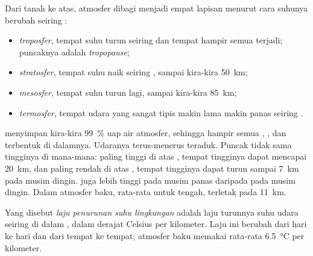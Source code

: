 \begin{definition}\label{def:g8:the-atmosphere:layers}
Dari tanah ke atas, atmosfer dibagi menjadi empat lapisan menurut cara
suhunya berubah seiring :
\begin{itemize}
  \item \emph{troposfer}, tempat suhu turun seiring
         dan tempat hampir semua  terjadi; puncaknya adalah
        \emph{tropopause};
  \item \emph{stratosfer}, tempat suhu naik seiring
        , sampai kira-kira \qty{50}{km};
  \item \emph{mesosfer}, tempat suhu turun lagi, sampai
        kira-kira \qty{85}{km};
  \item \emph{termosfer}, tempat udara yang sangat tipis
        makin lama makin panas seiring .
\end{itemize}
\end{definition}

 menyimpan kira-kira 99~\% uap air atmosfer, sehingga hampir semua
, , dan  terbentuk di dalamnya. Udaranya terus-menerus
teraduk. Puncak  tidak sama tingginya di mana-mana: 
paling tinggi di atas , tempat tingginya dapat mencapai
\qty{20}{km}, dan paling rendah di atas , tempat tingginya dapat turun
sampai \qty{7}{km} pada musim dingin.  juga lebih tinggi pada
musim panas daripada pada musim dingin. Dalam atmosfer baku, rata-rata
untuk  tengah,  terletak pada  \qty{11}{km}.

\begin{definition}\label{def:g8:the-atmosphere:lapse-rate}
Yang disebut \emph{laju penurunan suhu lingkungan}%
 adalah laju turunnya suhu udara seiring  di dalam
, dalam derajat Celsius per kilometer. Laju ini berubah dari hari
ke hari dan dari tempat ke tempat; atmosfer baku memakai rata-rata
\qty{6.5}{\degreeCelsius} per kilometer.
\end{definition}

